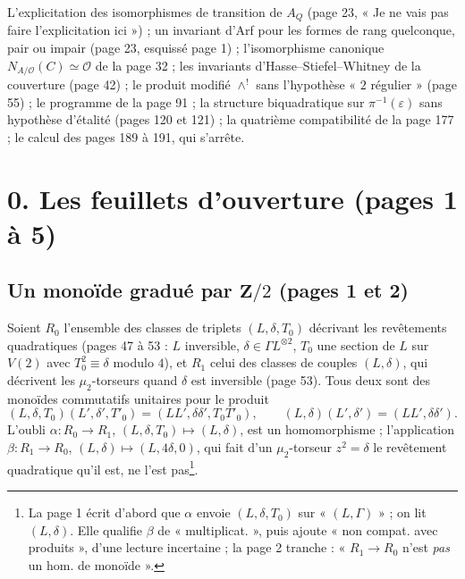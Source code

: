 \documentclass[11pt,a4paper]{article}
\begin{document}
L'explicitation des isomorphismes de transition de $A_Q$ (page 23, « Je ne vais
pas faire l'explicitation ici ») ; un invariant d'Arf pour les formes de rang
quelconque, pair ou impair (page 23, esquissé page 1) ; l'isomorphisme canonique
$N_{A/\mathcal{O}}(C) \simeq \mathcal{O}$ de la page 32 ; les invariants
d'Hasse--Stiefel--Whitney de la couverture (page 42) ; le produit modifié
$\wedge^{!}$ sans l'hypothèse « $2$ régulier » (page 55) ; le programme de la
page 91 ; la structure biquadratique sur $\pi^{-1}(\varepsilon)$ sans hypothèse
d'étalité (pages 120 et 121) ; la quatrième compatibilité de la page 177 ; le
calcul des pages 189 à 191, qui s'arrête.

\section*{0. Les feuillets d'ouverture (pages 1 à 5)}

\subsection*{Un monoïde gradué par $\mathbf{Z}/2$ (pages 1 et 2)}

Soient $R_0$ l'ensemble des classes de triplets $(L, \delta, T_0)$ décrivant les
revêtements quadratiques (pages 47 à 53 : $L$ inversible, $\delta \in \Gamma
L^{\otimes 2}$, $T_0$ une section de $L$ sur $V(2)$ avec $T_0^{2} \equiv \delta$
modulo $4$), et $R_1$ celui des classes de couples $(L, \delta)$, qui décrivent
les $\mu_2$-torseurs quand $\delta$ est inversible (page 53). Tous deux sont des
monoïdes commutatifs unitaires pour le produit
\[
  (L, \delta, T_0)(L', \delta', T'_0) = (LL', \delta\delta', T_0T'_0), \qquad
  (L, \delta)(L', \delta') = (LL', \delta\delta').
\]
L'oubli $\alpha : R_0 \to R_1$, $(L, \delta, T_0) \mapsto (L, \delta)$, est un
homomorphisme ; l'application $\beta : R_1 \to R_0$, $(L, \delta) \mapsto (L,
4\delta, 0)$, qui fait d'un $\mu_2$-torseur $z^{2} = \delta$ le revêtement
quadratique qu'il est, ne l'est pas\footnote{La page 1 écrit d'abord que
$\alpha$ envoie $(L, \delta, T_0)$ sur « $(L, \Gamma)$ » ; on lit $(L, \delta)$. Elle
qualifie $\beta$ de « multiplicat. », puis ajoute « non compat. avec produits »,
d'une lecture incertaine ; la page 2 tranche : « $R_1 \to R_0$ n'est \emph{pas} un
hom. de monoïde ».}.
\end{document}
